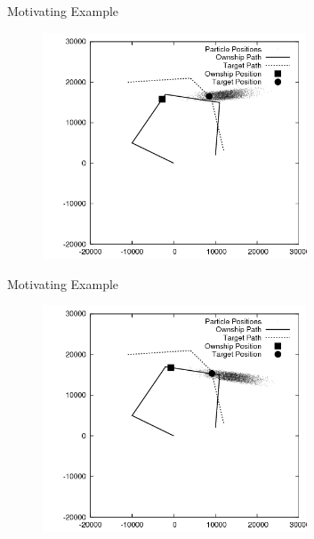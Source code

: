 \documentclass{beamer}
\begin{document}
\begin{frame}{Motivating Example}
\begin{figure}
\centering
\includegraphics[width=0.7\textwidth]{data/azimuth_only_1900.png}
\end{figure}
\end{frame}


\begin{frame}{Motivating Example}
\begin{figure}
\centering
\includegraphics[width=0.7\textwidth]{data/azimuth_only_2100.png}
\end{figure}
\end{frame}

\end{document}
